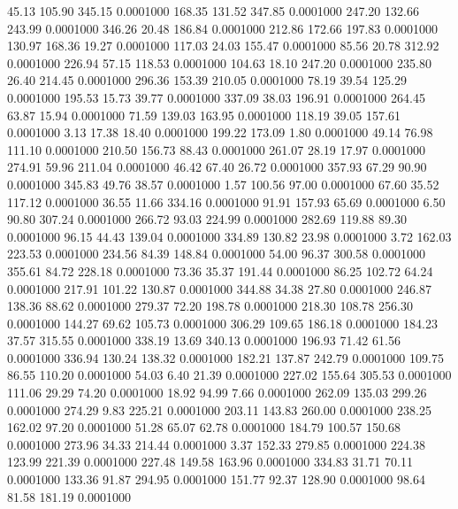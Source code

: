   45.13  105.90  345.15   0.0001000
 168.35  131.52  347.85   0.0001000
 247.20  132.66  243.99   0.0001000
 346.26   20.48  186.84   0.0001000
 212.86  172.66  197.83   0.0001000
 130.97  168.36   19.27   0.0001000
 117.03   24.03  155.47   0.0001000
  85.56   20.78  312.92   0.0001000
 226.94   57.15  118.53   0.0001000
 104.63   18.10  247.20   0.0001000
 235.80   26.40  214.45   0.0001000
 296.36  153.39  210.05   0.0001000
  78.19   39.54  125.29   0.0001000
 195.53   15.73   39.77   0.0001000
 337.09   38.03  196.91   0.0001000
 264.45   63.87   15.94   0.0001000
  71.59  139.03  163.95   0.0001000
 118.19   39.05  157.61   0.0001000
   3.13   17.38   18.40   0.0001000
 199.22  173.09    1.80   0.0001000
  49.14   76.98  111.10   0.0001000
 210.50  156.73   88.43   0.0001000
 261.07   28.19   17.97   0.0001000
 274.91   59.96  211.04   0.0001000
  46.42   67.40   26.72   0.0001000
 357.93   67.29   90.90   0.0001000
 345.83   49.76   38.57   0.0001000
   1.57  100.56   97.00   0.0001000
  67.60   35.52  117.12   0.0001000
  36.55   11.66  334.16   0.0001000
  91.91  157.93   65.69   0.0001000
   6.50   90.80  307.24   0.0001000
 266.72   93.03  224.99   0.0001000
 282.69  119.88   89.30   0.0001000
  96.15   44.43  139.04   0.0001000
 334.89  130.82   23.98   0.0001000
   3.72  162.03  223.53   0.0001000
 234.56   84.39  148.84   0.0001000
  54.00   96.37  300.58   0.0001000
 355.61   84.72  228.18   0.0001000
  73.36   35.37  191.44   0.0001000
  86.25  102.72   64.24   0.0001000
 217.91  101.22  130.87   0.0001000
 344.88   34.38   27.80   0.0001000
 246.87  138.36   88.62   0.0001000
 279.37   72.20  198.78   0.0001000
 218.30  108.78  256.30   0.0001000
 144.27   69.62  105.73   0.0001000
 306.29  109.65  186.18   0.0001000
 184.23   37.57  315.55   0.0001000
 338.19   13.69  340.13   0.0001000
 196.93   71.42   61.56   0.0001000
 336.94  130.24  138.32   0.0001000
 182.21  137.87  242.79   0.0001000
 109.75   86.55  110.20   0.0001000
  54.03    6.40   21.39   0.0001000
 227.02  155.64  305.53   0.0001000
 111.06   29.29   74.20   0.0001000
  18.92   94.99    7.66   0.0001000
 262.09  135.03  299.26   0.0001000
 274.29    9.83  225.21   0.0001000
 203.11  143.83  260.00   0.0001000
 238.25  162.02   97.20   0.0001000
  51.28   65.07   62.78   0.0001000
 184.79  100.57  150.68   0.0001000
 273.96   34.33  214.44   0.0001000
   3.37  152.33  279.85   0.0001000
 224.38  123.99  221.39   0.0001000
 227.48  149.58  163.96   0.0001000
 334.83   31.71   70.11   0.0001000
 133.36   91.87  294.95   0.0001000
 151.77   92.37  128.90   0.0001000
  98.64   81.58  181.19   0.0001000
